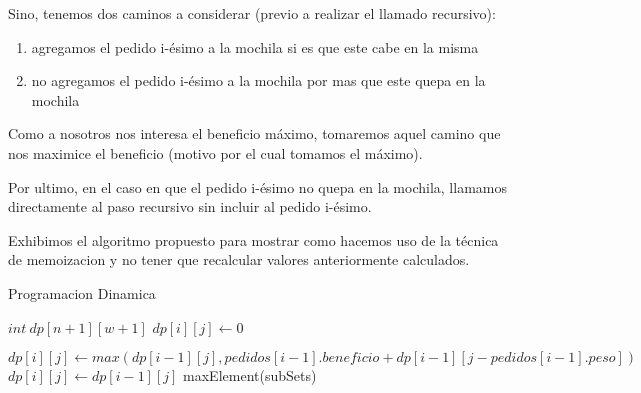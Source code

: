 Sino, tenemos dos caminos a considerar (previo a realizar el llamado recursivo):
\begin{enumerate}
	\item agregamos el pedido i-ésimo a la mochila si es que este cabe en la misma
	\item no agregamos el pedido i-ésimo a la mochila por mas que este quepa en la mochila
\end{enumerate}


Como a nosotros nos interesa el beneficio máximo, tomaremos aquel camino que nos maximice el beneficio (motivo por el cual tomamos el máximo).


Por ultimo, en el caso en que el pedido i-ésimo no quepa en la mochila, llamamos directamente al paso recursivo sin incluir al pedido i-ésimo.


Exhibimos el algoritmo propuesto para mostrar como hacemos uso de la técnica de memoizacion y no tener que recalcular valores anteriormente calculados.

\begin{algorithm}
\caption{Programacion Dinamica}\label{selection}
\begin{algorithmic}[1]
	\State $int \ dp[n+1][w+1]$
    				\State $dp[i][j] \gets 0$
    			
    			\Else
					\State $dp[i][j] \gets max(dp[i-1][j], pedidos[i-1].beneficio + dp[i-1][j-pedidos[i-1].peso])$
				\Else
					\State $dp[i][j] \gets dp[i-1][j]$
				\EndIf
			\EndIf
		\EndFor
    \EndFor
   	\Return maxElement(subSets)
\EndProcedure
\end{algorithmic}
\end{algorithm}

